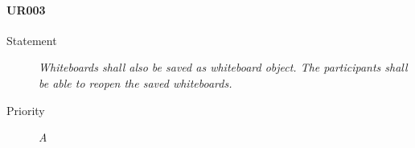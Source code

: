\paragraph{UR003}
  \begin{description}
  \item [Statement] 
    \textit{ Whiteboards shall also be saved as whiteboard object.
			The participants shall be able to reopen the saved whiteboards.}
  \item [Priority] \textit{A}
\end{description}